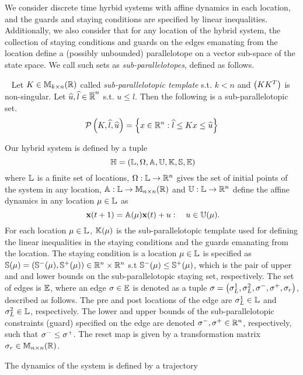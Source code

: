 We consider discrete time hyrbid systems with affine dynamics in each
location, and the guards and staying conditions are specified by
linear inequalities.  Additionally, we also consider that for any
location of the hybrid system, the collection of staying conditions
and guards on the edges emanating from the location define a (possibly
unbounded) parallelotope on a vector sub-space of the state space.  We
call such sets as \emph{sub-parallelotopes}, defined as follows.
%
\begin{definition}~\label{defn:sub-parallelotope} Let
  $K\in\mathbb{M}_{k\times n}(\mathbb{R})$ called \emph{sub-parallelotopic template}
  s.t. $k<n$ and $\left(KK^T\right)$ is non-singular.  Let
  $\widehat{u},\widehat{l}\in\mathbb{\overline{R}}^n$ s.t. $u\leq l$.  Then the following
  is a sub-parallelotopic set.
\[
\mathcal{P}\left(K,\widehat{l},\widehat{u}\right) = \left\{x\in\mathbb{R}^n: \widehat{l}\leq Kx \leq \widehat{u}\right\}
\]
\end{definition}

Our hybrid system is defined by a tuple 
\begin{equation}~\label{eqn:system}
\mathbb{H} =
\left(\mathbb{L},\Omega,\mathbb{A},\mathbb{U},\mathbb{K},\mathbb{S},\mathbb{E}\right)
\end{equation}
where $\mathbb{L}$ is a finite set of locations,
$\Omega:\mathbb{L}\rightarrow \mathbb{R}^n$ gives the set of initial points
of the system in any location,
$\mathbb{A}:\mathbb{L}\rightarrow\mathbb{M}_{n\times n}(\mathbb{R})$ and
$\mathbb{U}:\mathbb{L}\rightarrow\mathbb{R}^n$ define the affine dynamics in any
location $\mu\in\mathbb{L}$ as 
\begin{equation}~\label{eqn:next}
\textbf{x}(t+1) = \mathbb{A}(\mu)\textbf{x}(t)+u:~~~u\in\mathbb{U}(\mu).
\end{equation}
For each location $\mu\in\mathbb{L}$, $\mathbb{K}(\mu)$ is the
sub-parallelotopic template used for defining the linear inequalities
in the staying conditions and the guards emanating from the location.
The staying condition is a location $\mu\in\mathbb{L}$ is specified as
$\mathbb{S}(\mu)=\left(\mathbb{S}^-(\mu),\mathbb{S}^+(\mu)\right)\in\mathbb{R}^n\times\mathbb{R}^n$
s.t $\mathbb{S}^-(\mu)\leq\mathbb{S}^+(\mu)$, which is the pair of upper and
and lower bounds on the sub-parallelotopic staying set, respectively.
The set of edges is $\mathbb{E}$, where an edge
$\sigma\in\mathbb{E}$ is denoted as a tuple $\sigma =
\left(\sigma^1_L,\sigma^2_L,\sigma^-,\sigma^+,\sigma_r\right)$, described as
follows.  The pre and post locations of the edge are
$\sigma^1_L\in\mathbb{L}$ and $\sigma^2_L\in\mathbb{L}$,
respectively.  The lower and upper bounds of the sub-parallelotopic
constraints (guard) specified on the edge are denoted
$\sigma^-,\sigma^+\in\mathbb{R}^n$, respectively, such that
$\sigma^-\leq\sigma^+$.  The reset map is given by a transformation
matrix $\sigma_r\in\mathbb{M}_{n\times n}(\mathbb{R})$.

The dynamics of the system is defined by a trajectory 
